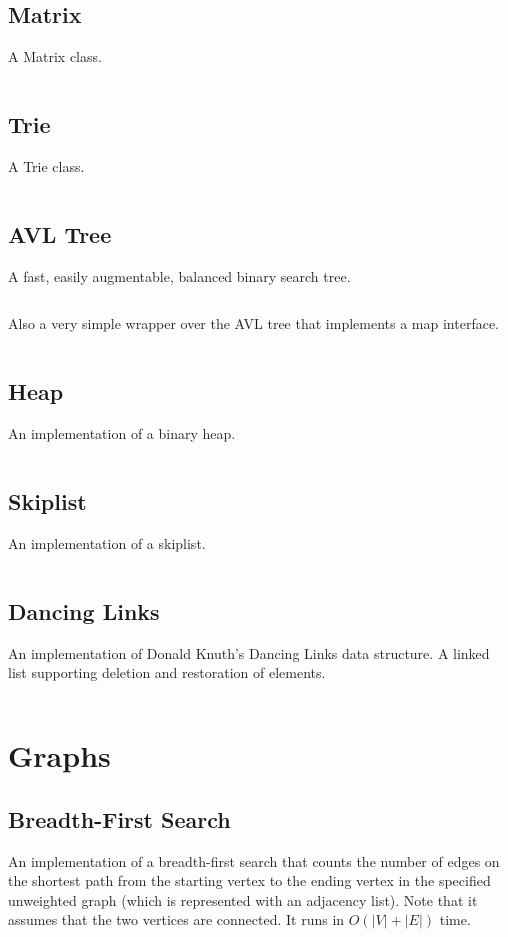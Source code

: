 \documentclass[9pt,a4paper,twocolumn,landscape,oneside]{amsart}
\newcommand{\code}[1]{\inputminted{cpp}{_code/#1}}
\begin{document}
    \subsection{Matrix}
        A Matrix class.
        \code{data-structures/matrix.cpp}

    \subsection{Trie}
        A Trie class.
        \code{data-structures/trie.cpp}

    \subsection{AVL Tree}
        A fast, easily augmentable, balanced binary search tree.
        \code{data-structures/avl_tree.cpp}

        Also a very simple wrapper over the AVL tree that implements a map
        interface.
        \code{data-structures/avl_map.cpp}

    \subsection{Heap}
        An implementation of a binary heap.
        \code{data-structures/heap.cpp}

    \subsection{Skiplist}
        An implementation of a skiplist.
        \code{data-structures/skiplist.cpp}

    \subsection{Dancing Links}
        An implementation of Donald Knuth's Dancing Links data structure. A
        linked list supporting deletion and restoration of elements.
        \code{data-structures/dancing_links.cpp}

\section{Graphs}
    \subsection{Breadth-First Search}
        An implementation of a breadth-first search that counts the number of
        edges on the shortest path from the starting vertex to the ending
        vertex in the specified unweighted graph (which is represented with an
        adjacency list). Note that it assumes that the two vertices are
        connected. It runs in $O(|V|+|E|)$ time.
        \code{graph/bfs.cpp}
\end{document}
